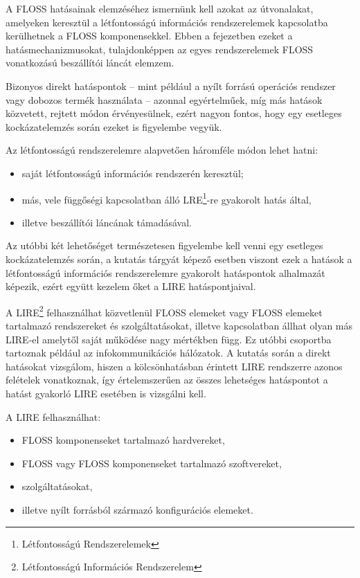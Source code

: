 \documentclass[12pt,magyar,a4paper,oneside]{scrreprt}
\providecommand{\tightlist}{%
  \setlength{\itemsep}{0pt}\setlength{\parskip}{0pt}}
\begin{document}
A FLOSS hatásainak elemzéséhez ismernünk kell azokat az útvonalakat,
amelyeken keresztül a létfontosságú információs rendszerelemek
kapcsolatba kerülhetnek a FLOSS komponensekkel. Ebben a fejezetben
ezeket a hatásmechanizmusokat, tulajdonképpen az egyes rendszerelemek
FLOSS vonatkozású beszállítói láncát elemzem.

Bizonyos direkt hatáspontok -- mint például a nyílt forrású operációs
rendszer vagy dobozos termék használata -- azonnal egyértelműek, míg más
hatások közvetett, rejtett módon érvényesülnek, ezért nagyon fontos,
hogy egy esetleges kockázatelemzés során ezeket is figyelembe vegyük.

Az létfontosságú rendszerelemre alapvetően háromféle módon lehet hatni:

\begin{itemize}
\tightlist
\item
  saját létfontosságú információs rendszerén keresztül;
\item
  más, vele függőségi kapcsolatban álló LRE\footnote{Létfontosságú
    Rendszerelemek}-re gyakorolt hatás által,
\item
  illetve beszállítói láncának támadásával.
\end{itemize}

Az utóbbi két lehetőséget természetesen figyelembe kell venni egy
esetleges kockázatelemzés során, a kutatás tárgyát képező esetben
viszont ezek a hatások a létfontosságú információs rendszerelemre
gyakorolt hatáspontok alhalmazát képezik, ezért együtt kezelem őket a
LIRE hatáspontjaival.

A LIRE\footnote{Létfontosságú Információs Rendszerelem} felhasználhat
közvetlenül FLOSS elemeket vagy FLOSS elemeket tartalmazó rendszereket
és szolgáltatásokat, illetve kapcsolatban állhat olyan más LIRE-el
amelytől saját működése nagy mértékben függ. Ez utóbbi csoportba
tartoznak például az infokommunikációs hálózatok. A kutatás során a
direkt hatásokat vizsgálom, hiszen a kölcsönhatásban érintett LIRE
rendszerre azonos felételek vonatkoznak, így értelemszerűen az összes
lehetséges hatáspontot a hatást gyakorló LIRE esetében is vizsgálni
kell.

A LIRE felhasználhat:

\begin{itemize}
\tightlist
\item
  FLOSS komponenseket tartalmazó hardvereket,
\item
  FLOSS vagy FLOSS komponenseket tartalmazó szoftvereket,
\item
  szolgáltatásokat,
\item
  illetve nyílt forrásból származó konfigurációs elemeket.
\end{itemize}
\end{document}
